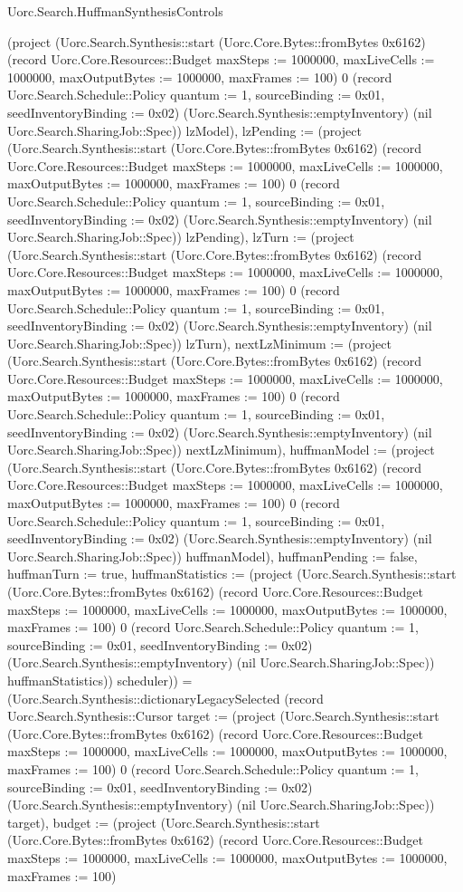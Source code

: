 \begin{lexlean}{Uorc.Search.HuffmanSynthesisControls}
\begin{semanticmodule}
{(project (Uorc.Search.Synthesis::start (Uorc.Core.Bytes::fromBytes 0x6162) (record Uorc.Core.Resources::Budget {maxSteps := 1000000, maxLiveCells := 1000000, maxOutputBytes := 1000000, maxFrames := 100}) 0 (record Uorc.Search.Schedule::Policy {quantum := 1, sourceBinding := 0x01, seedInventoryBinding := 0x02}) (Uorc.Search.Synthesis::emptyInventory) (nil Uorc.Search.SharingJob::Spec)) lzModel), lzPending := (project (Uorc.Search.Synthesis::start (Uorc.Core.Bytes::fromBytes 0x6162) (record Uorc.Core.Resources::Budget {maxSteps := 1000000, maxLiveCells := 1000000, maxOutputBytes := 1000000, maxFrames := 100}) 0 (record Uorc.Search.Schedule::Policy {quantum := 1, sourceBinding := 0x01, seedInventoryBinding := 0x02}) (Uorc.Search.Synthesis::emptyInventory) (nil Uorc.Search.SharingJob::Spec)) lzPending), lzTurn := (project (Uorc.Search.Synthesis::start (Uorc.Core.Bytes::fromBytes 0x6162) (record Uorc.Core.Resources::Budget {maxSteps := 1000000, maxLiveCells := 1000000, maxOutputBytes := 1000000, maxFrames := 100}) 0 (record Uorc.Search.Schedule::Policy {quantum := 1, sourceBinding := 0x01, seedInventoryBinding := 0x02}) (Uorc.Search.Synthesis::emptyInventory) (nil Uorc.Search.SharingJob::Spec)) lzTurn), nextLzMinimum := (project (Uorc.Search.Synthesis::start (Uorc.Core.Bytes::fromBytes 0x6162) (record Uorc.Core.Resources::Budget {maxSteps := 1000000, maxLiveCells := 1000000, maxOutputBytes := 1000000, maxFrames := 100}) 0 (record Uorc.Search.Schedule::Policy {quantum := 1, sourceBinding := 0x01, seedInventoryBinding := 0x02}) (Uorc.Search.Synthesis::emptyInventory) (nil Uorc.Search.SharingJob::Spec)) nextLzMinimum), huffmanModel := (project (Uorc.Search.Synthesis::start (Uorc.Core.Bytes::fromBytes 0x6162) (record Uorc.Core.Resources::Budget {maxSteps := 1000000, maxLiveCells := 1000000, maxOutputBytes := 1000000, maxFrames := 100}) 0 (record Uorc.Search.Schedule::Policy {quantum := 1, sourceBinding := 0x01, seedInventoryBinding := 0x02}) (Uorc.Search.Synthesis::emptyInventory) (nil Uorc.Search.SharingJob::Spec)) huffmanModel), huffmanPending := false, huffmanTurn := true, huffmanStatistics := (project (Uorc.Search.Synthesis::start (Uorc.Core.Bytes::fromBytes 0x6162) (record Uorc.Core.Resources::Budget {maxSteps := 1000000, maxLiveCells := 1000000, maxOutputBytes := 1000000, maxFrames := 100}) 0 (record Uorc.Search.Schedule::Policy {quantum := 1, sourceBinding := 0x01, seedInventoryBinding := 0x02}) (Uorc.Search.Synthesis::emptyInventory) (nil Uorc.Search.SharingJob::Spec)) huffmanStatistics)}) scheduler)) = (Uorc.Search.Synthesis::dictionaryLegacySelected (record Uorc.Search.Synthesis::Cursor {target := (project (Uorc.Search.Synthesis::start (Uorc.Core.Bytes::fromBytes 0x6162) (record Uorc.Core.Resources::Budget {maxSteps := 1000000, maxLiveCells := 1000000, maxOutputBytes := 1000000, maxFrames := 100}) 0 (record Uorc.Search.Schedule::Policy {quantum := 1, sourceBinding := 0x01, seedInventoryBinding := 0x02}) (Uorc.Search.Synthesis::emptyInventory) (nil Uorc.Search.SharingJob::Spec)) target), budget := (project (Uorc.Search.Synthesis::start (Uorc.Core.Bytes::fromBytes 0x6162) (record Uorc.Core.Resources::Budget {maxSteps := 1000000, maxLiveCells := 1000000, maxOutputBytes := 1000000, maxFrames := 100}) }
\end{semanticmodule}
\end{lexlean}
